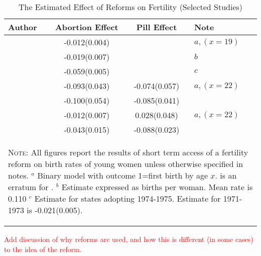 \begin{table}[htpb!]
\caption{The Estimated Effect of Reforms on Fertility (Selected Studies)}
\begin{tabular}{lccl} \toprule
Author & Abortion Effect & Pill Effect & Note \\ \midrule
\citet{AngristEvans1996}      & -0.012(0.004) &               & $a,(x=19)$   \\
\citet{Levineetal1996}        & -0.019(0.007) &               & $b$          \\
\citet{Gruberetal1999}        & -0.059(0.005) &               & $c$          \\
\citet{Bailey2006}            & -0.093(0.043) & -0.074(0.057) & $a,(x=22)$ \\
\citet{Guldi2008}             & -0.100(0.054) & -0.085(0.041) &              \\
\citet{Bailey2009}            & -0.012(0.007) &  0.028(0.048) & $a,(x=22)$ \\
\citet{OltmansHungerman2012}  & -0.043(0.015) & -0.088(0.023) &              \\
\bottomrule
\multicolumn{4}{p{12.2cm}}{\begin{footnotesize}\textsc{Note:} All figures report 
the results of short term access of a fertility reform on birth rates of young 
women unless otherwise specified in notes. \newline 
$^a$ Binary model with outcome 1=first birth by age $x$. \citet{Bailey2009} is
an erratum for \citeyear{Bailey2006}.\newline
$^b$ Estimate expressed as births per woman.  Mean rate is 0.110 \newline 
$^c$ Estimate for states adopting 1974-1975. Estimate for 1971-1973 is 
-0.021(0.005). %
\end{footnotesize}} \\
\end{tabular}
\end{table}

\textcolor{red}{Add discussion of why reforms are used, and how this is
different (in some cases) to the idea of the reform}.


